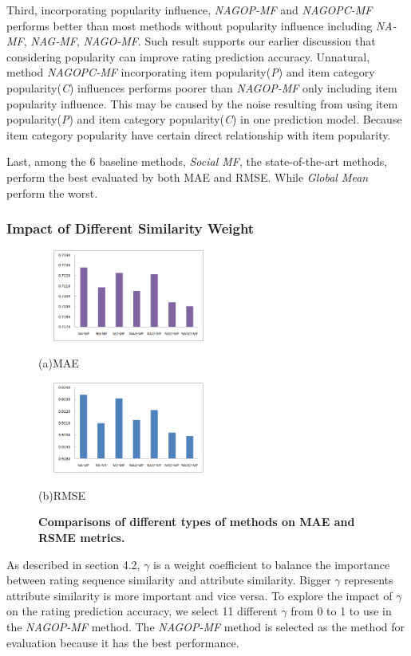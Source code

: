 \documentclass{llncs}
\begin{document}
	Third, incorporating popularity influence, \emph{NAGOP-MF} and \emph{NAGOPC-MF}
	performs better than most methods without popularity influence including \emph{NA-MF}, \emph{NAG-MF}, \emph{NAGO-MF}.
	Such result supports our earlier discussion
	that considering popularity can improve rating prediction accuracy.
	Unnatural, method \emph{NAGOPC-MF} incorporating item popularity(\emph{P}) and item category popularity(\emph{C}) influences performs
	poorer than \emph{NAGOP-MF} only including item popularity influence.
	This may be caused by the noise resulting from using item popularity(\emph{P})
	and item category popularity(\emph{C}) in one prediction model.
	Because item category popularity have certain direct relationship with item popularity.
	
	Last, among the 6 baseline methods, \emph{Social MF}, the
	state-of-the-art methods, perform the best evaluated by both MAE and RMSE.
	While \emph{Global Mean} perform the worst.
	
	\subsubsection{Impact of Different Similarity Weight}
	\begin{figure}
		\centering
		\begin{minipage}{0.48\linewidth}
			\centerline{\includegraphics[height=3cm, width=6cm]{MAE.eps}}
			\centerline{(a)MAE}
		\end{minipage}
		\hfill
		\begin{minipage}{0.48\linewidth}
			\centerline{\includegraphics[height=3cm, width=6cm]{RSME.eps}}
			\centerline{(b)RMSE}
		\end{minipage}
		\caption{\textbf{Comparisons of different types of methods on MAE and RSME metrics. }}
	\end{figure}
	As described in section 4.2, $\gamma$ is a weight coefficient to balance the importance between rating sequence similarity and attribute similarity.
	Bigger $\gamma$ represents attribute similarity is more important and vice versa.
	To explore the impact of $\gamma$ on the rating prediction accuracy,
	we select 11 different $\gamma$ from 0 to 1 to use in the \emph{NAGOP-MF} method.
	The \emph{NAGOP-MF} method is selected as the method for evaluation because it has
	the best performance.
	
\end{document}
